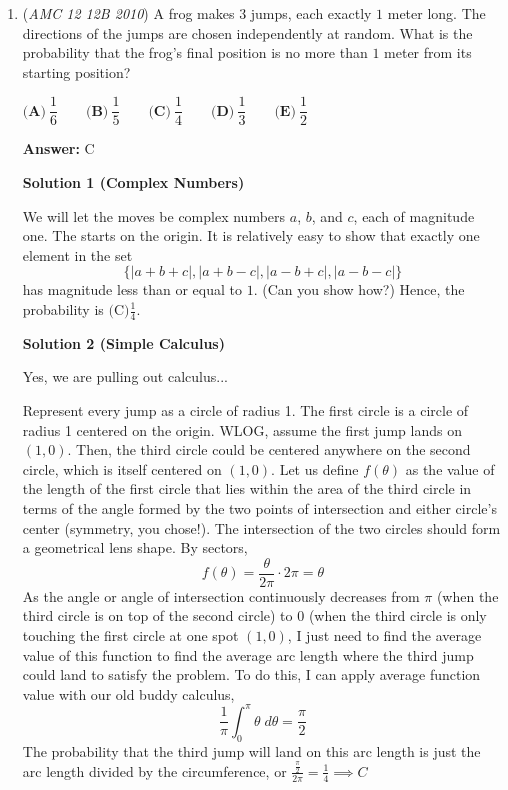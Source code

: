 \begin{enumerate}
 The answer to the problem is $12+12+18 = \boxed{\text{(D) }42}$ ways to make a chart in total.

 


	\item (\textit{AMC 12 12B 2010}) A frog makes $3$ jumps, each exactly $1$ meter long. The directions of the jumps are chosen independently at random. What is the probability that the frog's final position is no more than $1$ meter from its starting position?


 $\textbf{(A)}\ \dfrac{1}{6} \qquad \textbf{(B)}\ \dfrac{1}{5} \qquad \textbf{(C)}\ \dfrac{1}{4} \qquad \textbf{(D)}\ \dfrac{1}{3} \qquad \textbf{(E)}\ \dfrac{1}{2}$

 \textbf{Answer: }C



\textbf{Solution 1 (Complex Numbers)}

We will let the moves be complex numbers $a$, $b$, and $c$, each of magnitude one. The  starts on the origin. It is relatively easy to show that exactly one element in the set
 \[\{|a + b + c|, |a + b - c|, |a - b + c|, |a - b - c|\}\]has magnitude less than or equal to $1$. (Can you show how?) Hence, the probability is $\boxed{\text{(C)} \frac {1}{4}}$.

 



\textbf{Solution 2 (Simple Calculus)}

Yes, we are pulling out calculus...

 
Represent every jump as a circle of radius 1. The first circle is a circle of radius 1 centered on the origin. WLOG, assume the first jump lands on $(1,0)$. Then, the third circle could be centered anywhere on the second circle, which is itself centered on $(1,0)$. Let us define $f(\theta)$ as the value of the length of the first circle that lies within the area of the third circle in terms of the angle formed by the two points of intersection and either circle's center (symmetry, you chose!). The intersection of the two circles should form a geometrical lens shape. By sectors,
 \[f(\theta)=\frac{\theta}{2\pi}\cdot2\pi=\theta\] As the angle or angle of intersection continuously decreases from $\pi$ (when the third circle is on top of the second circle) to $0$ (when the third circle is only touching the first circle at one spot $(1,0)$, I just need to find the average value of this function to find the average arc length where the third jump could land to satisfy the problem. To do this, I can apply average function value with our old buddy calculus,
 \[\frac{1}{\pi}\int_0^{\pi}\theta\;d\theta=\frac{\pi}{2}\]The probability that the third jump will land on this arc length is just the arc length divided by the circumference, or $\frac{\frac{\pi}{2}}{2\pi}=\frac{1}{4} \implies \boxed{C}$





\end{enumerate}
